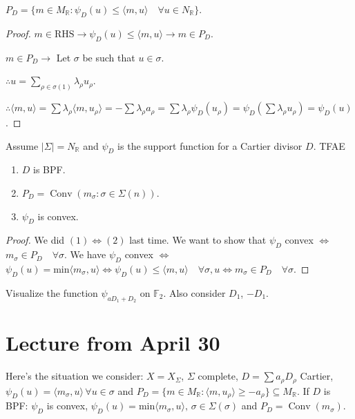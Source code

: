 \documentclass[a4paper,12pt]{amsart}
\DeclareMathOperator{\Conv}{Conv}
\begin{document}
\begin{Lemma}
	$P_D = \{ m \in M_\mathbb{R}: \psi_D(u) \leq \langle m,u \rangle \quad \forall u \in N_\mathbb{R}\}$.
\end{Lemma}
\begin{proof}
	$m \in \text{RHS} \rightarrow \psi_D(u) \leq \langle m,u \rangle \rightarrow m \in P_D$. 
	
	$m \in P_D \rightarrow$ Let $\sigma$ be such that $u \in \sigma$.
	
	$\therefore u = \sum_{\rho \in \sigma(1)} \lambda_\rho u_\rho$.
	
	$\therefore \langle m,u \rangle = \sum \lambda_\rho \langle m, u_\rho \rangle = - \sum \lambda_\rho a_\rho = \sum \lambda_\rho \psi_D(u_\rho) = \psi_D(\sum \lambda_\rho u_\rho) = \psi_D(u)$.
\end{proof}
\begin{theorem}
	Assume $|\Sigma| = N_\mathbb{R}$ and $\psi_D$ is the support function for a Cartier divisor $D$. TFAE
	\begin{enumerate}
		\item $D$ is BPF.
		\item $P_D = \Conv (m_\sigma: \sigma \in \Sigma(n))$.
		\item $\psi_D$ is convex.
	\end{enumerate}
\end{theorem}
\begin{proof}
	We did $(1) \Leftrightarrow (2)$ last time. We want to show that $\psi_D$ convex $\Leftrightarrow$ $m_\sigma \in P_D \quad \forall \sigma$.
	We have $\psi_D$ convex $\Leftrightarrow$ $\psi_D(u) = \text{min} \langle m_\sigma, u \rangle \Leftrightarrow \psi_D(u) \leq \langle m,u \rangle \quad \forall \sigma, u \Leftrightarrow m_\sigma \in P_D \quad \forall \sigma$. 
\end{proof}
\begin{exercise}
	Visualize the function $\psi_{a D_1 + D_2}$ on $\mathbb{F}_2$. Also consider $D_1$, $-D_1$.
\end{exercise}

\newpage

\section{Lecture from April 30}
Here's the situation we consider: $X = X_\Sigma$, $\Sigma$ complete, $D = \sum a_\rho D_\rho$ Cartier, $\psi_D(u) = \langle m_\sigma, u \rangle \, \forall u \in \sigma$ and $P_D = \{ m \in M_\mathbb{R}: \langle m,u_\rho \rangle \geq -a_\rho\} \subseteq M_\mathbb{R}$. If $D$ is BPF: $\psi_D$ is convex, $\psi_D(u)=\text{min} \langle m_\sigma, u \rangle, \, \sigma \in \Sigma(\sigma)$ and $P_D = \Conv(m_\sigma)$.
\end{document}

